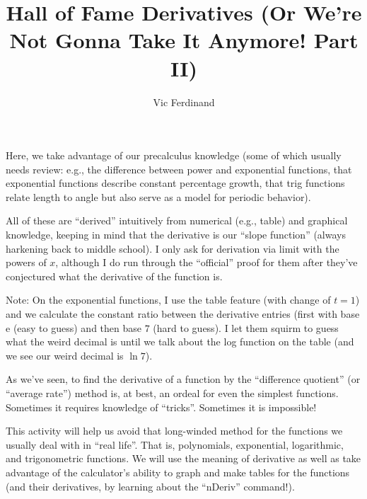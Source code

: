 \documentclass{ximera}
\author{Vic Ferdinand}
\title{Hall of Fame Derivatives (Or We're Not Gonna Take It Anymore! Part II)}
\begin{document}
\begin{abstract}
\end{abstract}
\maketitle

\begin{instructorIntro}
Here, we take advantage of our precalculus knowledge (some of which usually needs review:  e.g., the difference between power and exponential functions, that exponential functions describe constant percentage growth, that trig functions relate length to angle but also serve as a model for periodic behavior).

All of these are ``derived'' intuitively from numerical (e.g., table) and graphical knowledge, keeping in mind that the derivative is our ``slope function'' (always harkening back to middle school).  I only ask for derivation via limit with the powers of $x$, although I do run through the ``official'' proof for them after they've conjectured what the derivative of the function is.

Note:  On the exponential functions, I use the table feature (with change of $t = 1$) and we calculate the constant ratio between the derivative entries (first with base e (easy to guess) and then base $7$ (hard to guess).  I let them squirm to guess what the weird decimal is until we talk about the log function on the table (and we see our weird decimal is $\ln 7$).

\end{instructorIntro}



As we've seen, to find the derivative of a function by the ``difference quotient'' (or ``average rate'') method is, at best, an ordeal for even the simplest functions.  Sometimes it requires knowledge of ``tricks''.  Sometimes it is impossible!

 This activity will help us avoid that long-winded method for the functions we usually deal with in ``real life''.  That is, polynomials, exponential, logarithmic, and trigonometric functions.  We will use the meaning of derivative as well as take advantage of the calculator's ability to graph and make tables for the functions (and their derivatives, by learning about the ``nDeriv'' command!).
     
\end{document}

